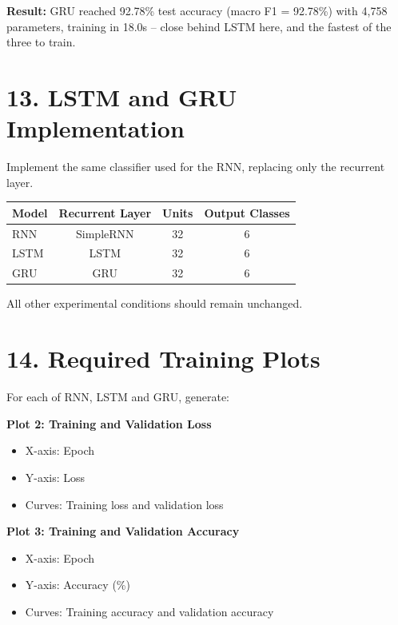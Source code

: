 \documentclass[10pt]{article}
\begin{document}
\textbf{Result:} GRU reached 92.78\% test accuracy (macro F1 = 92.78\%)
with 4,758 parameters, training in 18.0s -- close behind LSTM here, and
the fastest of the three to train.

\section*{13. LSTM and GRU Implementation}

Implement the same classifier used for the RNN, replacing only the recurrent
layer.

\begin{center}
\begin{tabular}{|l|c|c|c|}
\hline
Model & Recurrent Layer & Units & Output Classes\\
\hline
RNN & SimpleRNN & 32 & 6\\
LSTM & LSTM & 32 & 6\\
GRU & GRU & 32 & 6\\
\hline
\end{tabular}
\end{center}

All other experimental conditions should remain unchanged.

\section*{14. Required Training Plots}

For each of RNN, LSTM and GRU, generate:

\textbf{Plot 2: Training and Validation Loss}

\begin{itemize}
\item X-axis: Epoch
\item Y-axis: Loss
\item Curves: Training loss and validation loss
\end{itemize}

\textbf{Plot 3: Training and Validation Accuracy}

\begin{itemize}
\item X-axis: Epoch
\item Y-axis: Accuracy (\%)
\item Curves: Training accuracy and validation accuracy
\end{itemize}
\end{document}
